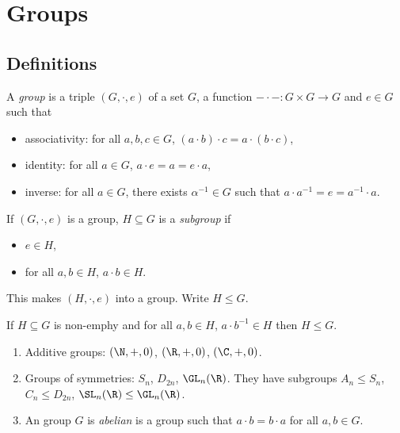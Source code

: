 \documentclass[a4paper]{article}
\begin{document}


\tableofcontents

\section{Groups}

\subsection{Definitions}

\begin{definition}[Group]
  A \emph{group} is a triple \((G, \cdot, e)\) of a set \(G\), a function \(- \cdot -: G \times G \to G\) and \(e \in G\) such that
  \begin{itemize}
  \item associativity: for all \(a, b, c \in G\), \((a \cdot b) \cdot c = a \cdot (b \cdot c)\),
  \item identity: for all \(a \in G\), \(a \cdot e = a = e \cdot a\),
  \item inverse: for all \(a \in G\), there exists \(\alpha^{-1} \in G\) such that \(a \cdot a^{-1} = e = a^{-1} \cdot a\).
  \end{itemize}
\end{definition}

\begin{definition}[Subgroup]
  If \((G, \cdot, e)\) is a group, \(H \subseteq G\) is a \emph{subgroup} if
  \begin{itemize}
  \item \(e \in H\),
  \item for all \(a, b \in H\), \(a \cdot b \in H\).
  \end{itemize}
  This makes \((H, \cdot, e)\) into a group. Write \(H \leq G\).
\end{definition}

\begin{lemma}
  If \(H \subseteq G\) is non-emphy and for all \(a, b \in H\), \(a \cdot b^{-1} \in H\) then \(H \leq G\).
\end{lemma}

\begin{eg}\leavevmode
  \begin{enumerate}
  \item Additive groups: \((\N, +, 0)\), \((\R, +, 0)\), \((\C, +, 0)\).
  \item Groups of symmetries: \(S_n\), \(D_{2n}\), \(\GL_n(\R)\). They have subgroups \(A_n \leq S_n\), \(C_n \leq D_{2n}\), \(\SL_n(\R) \leq \GL_n(\R)\).
  \item An group \(G\) is \emph{abelian} is a group such that \(a \cdot b = b \cdot a\) for all \(a, b \in G\).
  \end{enumerate}
\end{eg}
\end{document}
